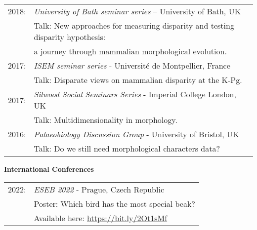 \documentclass[10pt,a4paper]{article}
\begin{document}
{\begin{tabular}{ll}
2018: & \textit{University of Bath seminar series} – University of Bath, UK\\
      & Talk: New approaches for measuring disparity and testing disparity hypothesis:\\
      & a journey through mammalian morphological evolution.\\
2017: & \textit{ISEM seminar series} - Universit\'{e} de Montpellier, France\\
      & Talk: Disparate views on mammalian disparity at the K-Pg.\\ 
2017: & \textit{Silwood Social Seminars Series} - Imperial College London, UK\\
      & Talk: Multidimensionality in morphology.\\ 
2016: & \textit{Palaeobiology Discussion Group} - University of Bristol, UK\\
      & Talk: Do we still need morphological characters data?\\ 
\end{tabular}

\bigskip

\raggedright\textbf{International Conferences}\\[1.5ex]


\begin{tabular}{ll}
2022: & \textit{ESEB 2022} - Prague, Czech Republic\\
      & Poster: Which bird has the most special beak?\\
      & Available here: \href{https://figshare.com/articles/Shifting_spaces_which_disparity_or_dissimilarity_metrics_best_summarise_occupancy_in_multidimensional_spaces_/9922961}{https://bit.ly/2Ot1sMf}\\
\end{tabular}

}
\end{document}
